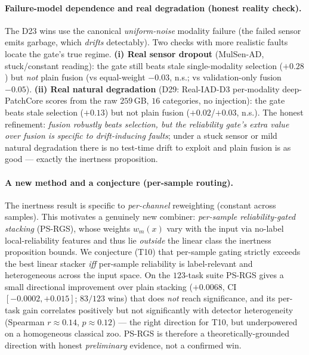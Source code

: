 \documentclass[11pt,titlepage]{article}
\begin{document}
\paragraph{Failure-model dependence and real degradation (honest reality check).}
The D23 wins use the canonical \emph{uniform-noise} modality failure (the failed
sensor emits garbage, which \emph{drifts} detectably). Two checks with more realistic
faults locate the gate's true regime. \textbf{(i) Real sensor dropout} (MulSen-AD,
stuck/constant reading): the gate still beats stale single-modality selection
($+0.28$) but \emph{not} plain fusion (vs equal-weight $-0.03$, n.s.; vs
validation-only fusion $-0.05$). \textbf{(ii) Real natural degradation} (D29:
Real-IAD-D3 per-modality deep-PatchCore scores from the raw $259$\,GB, $16$ categories,
no injection): the gate beats stale selection ($+0.13$) but not plain fusion
($+0.02$/$+0.03$, n.s.). The honest refinement: \emph{fusion robustly beats selection,
but the reliability gate's extra value over fusion is specific to drift-inducing
faults}; under a stuck sensor or mild natural degradation there is no test-time drift to
exploit and plain fusion is as good --- exactly the inertness proposition.

\paragraph{A new method and a conjecture (per-sample routing).} The inertness result is
specific to \emph{per-channel} reweighting (constant across samples). This motivates a
genuinely new combiner: \emph{per-sample reliability-gated stacking} (PS-RGS), whose
weights $w_m(x)$ vary with the input via no-label local-reliability features and thus
lie \emph{outside} the linear class the inertness proposition bounds. We conjecture
(T10) that per-sample gating strictly exceeds the best linear stacker \emph{iff}
per-sample reliability is label-relevant and heterogeneous across the input space. On
the $123$-task suite PS-RGS gives a small directional improvement over plain stacking
($+0.0068$, CI $[-0.0002,+0.015]$; $83/123$ wins) that does \emph{not} reach
significance, and its per-task gain correlates positively but not significantly with
detector heterogeneity (Spearman $r\!\approx\!0.14$, $p\!\approx\!0.12$) --- the right
direction for T10, but underpowered on a homogeneous classical zoo. PS-RGS is therefore
a theoretically-grounded direction with honest \emph{preliminary} evidence, not a
confirmed win.
\end{document}
